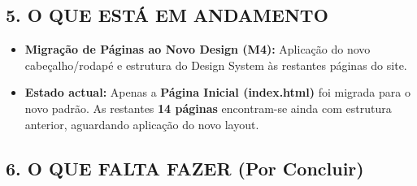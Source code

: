 \subsection{5. O QUE ESTÁ EM
ANDAMENTO}\label{o-que-estuxe1-em-andamento}

\begin{itemize}
\tightlist
\item
  \textbf{Migração de Páginas ao Novo Design (M4):} Aplicação do novo
  cabeçalho/rodapé e estrutura do Design System às restantes páginas do
  site.
\item
  \textbf{Estado actual:} Apenas a \textbf{Página Inicial (index.html)}
  foi migrada para o novo padrão. As restantes \textbf{14 páginas}
  encontram-se ainda com estrutura anterior, aguardando aplicação do
  novo layout.
\end{itemize}

\subsection{6. O QUE FALTA FAZER (Por
Concluir)}\label{o-que-falta-fazer-por-concluir}

